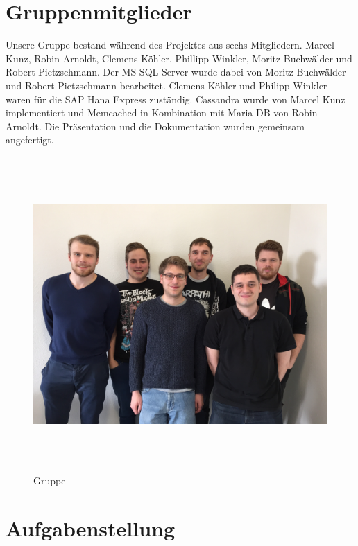 \documentclass[a4paper, 12pt]{scrartcl}
\begin{document}
\section{Gruppenmitglieder}
Unsere Gruppe bestand während des Projektes aus sechs Mitgliedern. Marcel Kunz, Robin Arnoldt, Clemens Köhler, Phillipp Winkler, Moritz Buchwälder und Robert Pietzschmann. Der MS SQL Server wurde dabei von Moritz Buchwälder und Robert Pietzschmann bearbeitet. Clemens Köhler und Philipp Winkler waren für die SAP Hana Express zuständig. Cassandra wurde von Marcel Kunz implementiert und Memcached in Kombination mit Maria DB von Robin Arnoldt. Die Präsentation und die Dokumentation wurden gemeinsam angefertigt. 
\begin{figure}[H]
\centering
\includegraphics[height=12cm, width=15cm, keepaspectratio]{Gruppe.jpg}
\caption{Gruppe}
\end{figure}

\newpage
\section{Aufgabenstellung}
\end{document}
